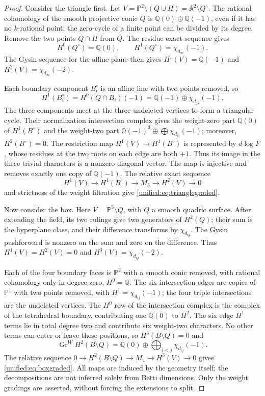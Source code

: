 \documentclass[11pt,a4paper,oneside]{article}
\theoremstyle{plain}
\theoremstyle{definition}
\theoremstyle{remark}
\newcommand{\Q}{\mathbb Q}
\numberwithin{equation}{section}
\begin{document}
\begin{proof}
Consider the triangle first. Let $V=\mathbb P^2\setminus(Q\cup H)=\mathbb A^2\setminus Q^\circ$.
The rational cohomology of the smooth projective conic $Q$ is $\Q(0)\oplus\Q(-1)$,
even if it has no $k$-rational point: the zero-cycle of a finite point can be divided by its degree.
Remove the two points $Q\cap H$ from $Q$. The residue exact sequence gives
\[
 H^0(Q^\circ)=\Q(0),\qquad H^1(Q^\circ)=\chi_{d_\infty}(-1).
\]
The Gysin sequence for the affine plane then gives
$H^1(V)=\Q(-1)$ and $H^2(V)=\chi_{d_\infty}(-2)$.

Each boundary component $B_i^\circ$ is an affine line with two points removed, so
\[
 H^1(B_i^\circ)=H^0(Q\cap B_i)(-1)
               =\Q(-1)\oplus\chi_{d_{jk}}(-1).
\]
The three components meet at the three undeleted vertices to form a triangular cycle.
Their normalization intersection complex gives the weight-zero part $\Q(0)$ of $H^1(B^\circ)$
and the weight-two part $\Q(-1)^3\oplus\bigoplus\chi_{d_{ij}}(-1)$;
moreover, $H^2(B^\circ)=0$.
The restriction map $H^1(V)\to H^1(B^\circ)$ is represented by $d\log F$,
whose residues at the two roots on each edge are both $+1$. Thus its image in the three trivial characters is a nonzero diagonal vector.
The map is injective and removes exactly one copy of $\Q(-1)$. The relative exact sequence
\[
 H^1(V)\longrightarrow H^1(B^\circ)\longrightarrow M_3
            \longrightarrow H^2(V)\longrightarrow0
\]
and strictness of the weight filtration give \eqref{unified:eq:trianglegraded}.

Now consider the box. Here $V=\mathbb P^3\setminus Q$, with $Q$ a smooth quadric surface.
After extending the field, its two rulings give two generators of $H^2(Q)$;
their sum is the hyperplane class, and their difference transforms by $\chi_{d_Q}$.
The Gysin pushforward is nonzero on the sum and zero on the difference.
Thus $H^1(V)=H^2(V)=0$ and $H^3(V)=\chi_{d_Q}(-2)$.

Each of the four boundary faces is $\mathbb P^2$ with a smooth conic removed,
with rational cohomology only in degree zero, $H^0=\Q$. The six intersection edges are copies of $\mathbb P^1$ with two points removed,
with $H^1=\chi_{d_{ij}}(-1)$; the four triple intersections are the undeleted vertices.
The $H^0$ row of the intersection complex is the complex of the tetrahedral boundary, contributing one $\Q(0)$ to $H^2$.
The six edge $H^1$ terms lie in total degree two and contribute six weight-two characters.
No other terms can enter or leave these positions, so $H^3(B\setminus Q)=0$ and
\[
 \operatorname{Gr}^W H^2(B\setminus Q)
   =\Q(0)\oplus\bigoplus_{i<j}\chi_{d_{ij}}(-1).
\]
The relative sequence $0\to H^2(B\setminus Q)\to M_4\to H^3(V)\to0$
gives \eqref{unified:eq:boxgraded}. All maps are induced by the geometry itself;
the decompositions are not inferred solely from Betti dimensions. Only the weight gradings are asserted, without forcing the extensions to split.
\end{proof}
\end{document}
